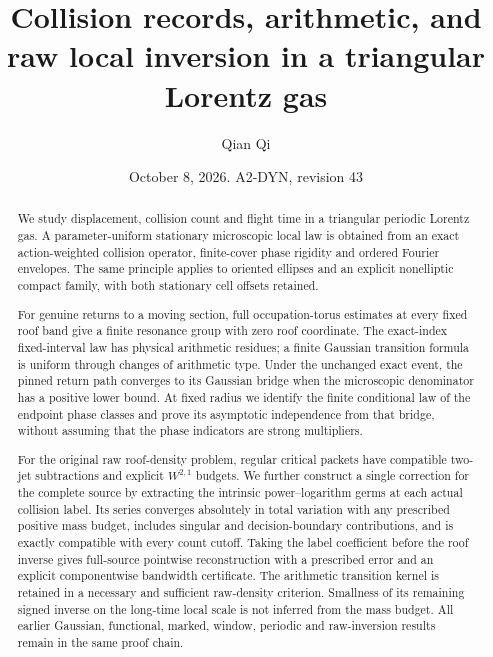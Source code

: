 \documentclass[11pt,reqno]{amsart}
\title[Collision records and raw local inversion]{Collision records, arithmetic, and raw local inversion in a triangular Lorentz gas}
\author{Qian Qi}
\date{October 8, 2026. A2-DYN, revision 43}
\numberwithin{equation}{section}
\theoremstyle{definition}\newtheorem{definition}[theorem]{Definition}
\theoremstyle{remark}\newtheorem{remark}[theorem]{Remark}
\begin{document}
\raggedbottom
\begin{abstract}
We study displacement, collision count and flight time in a triangular
periodic Lorentz gas. A parameter-uniform stationary microscopic local
law is obtained from an exact action-weighted collision operator,
finite-cover phase rigidity and ordered Fourier envelopes. The same
principle applies to oriented ellipses and an explicit nonelliptic
compact family, with both stationary cell offsets retained.

For genuine returns to a moving section, full occupation-torus
estimates at every fixed roof band give a finite resonance group with
zero roof coordinate. The exact-index fixed-interval law has physical
arithmetic residues; a finite Gaussian transition formula is uniform
through changes of arithmetic type. Under the unchanged exact event,
the pinned return path converges to its Gaussian bridge when the
microscopic denominator has a positive lower bound. At fixed radius
we identify the finite conditional law of the endpoint phase classes
and prove its asymptotic independence from that bridge, without
assuming that the phase indicators are strong multipliers.

For the original raw roof-density problem, regular critical packets
have compatible two-jet subtractions and explicit $W^{2,1}$ budgets.
We further construct a single correction for the complete source by
extracting the intrinsic power--logarithm germs at each actual collision
label. Its series converges absolutely in total variation with any
prescribed positive mass budget, includes singular and decision-boundary
contributions, and is exactly compatible with every count cutoff.
Taking the label coefficient before the roof inverse gives full-source
pointwise reconstruction with a prescribed error and an explicit
componentwise bandwidth certificate. The arithmetic transition kernel
is retained in a necessary and sufficient raw-density criterion.
Smallness of its remaining signed inverse on the long-time local scale
is not inferred from the mass budget. All earlier Gaussian, functional,
marked, window, periodic and raw-inversion results remain in the same
proof chain.
\end{abstract}
\maketitle
\enlargethispage{3pt}
\end{document}
